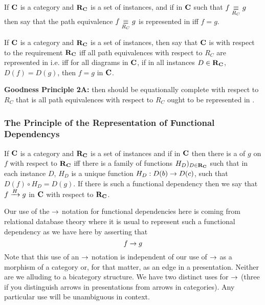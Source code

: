\begin{definition}
If $\catc$ is a  category and $\reqtc$ is a set of instances,
 and if \fgparalleldiag in $\catc$ such that $f \pequiv g$
 then say that the path equivalence $f \pequiv g$ is represented in \catcw iff
 $f=g$.
\end{definition}

\begin{oldtt}
\begin{definition}
If $\catc$ is a  category and $\reqtc$ is a set of instances,
 then say that  $\catc$ is  with respect 
to the requirement $\reqtc$ iff all path equivalences with respect to $R_C$ are represented in \catcw 
i.e. iff for all diagrams \fgparalleldiag in $\catc$,  
if in all instances $D \in \reqtc$, $D(f)=D(g)$,  then $f=g$ in $\catc$.
\end{definition}
\end{oldtt}

\textbf{Goodness Principle 2A:} \IfSforCwithRCwords then \catcw should be equationally complete with respect to $R_C$ that is all path equivalences with respect to $R_C$  ought to be represented in \catc.

\subsubsection{The Principle of the Representation of Functional Dependencys}

\begin{definition}
If $\catc$ is a category and $\reqtc$ is a set of instances and if \fgsourcediag
in $\catc$ then there is a   of $g$ on $f$ with respect to $\reqtc$ iff
there is a family of functions $H_D)_{D \in \reqtc}$ such that 
in each instance $D$, $H_D$ is a unique function $H_D: D(b) \morph D(c)$, such that $D(f) \circ H_D = D(g)$. 
If there is such a functional dependency then we say that $\fundep{H}{f}{g}$ in $\catc$ with respect to $\reqtc$.
\end{definition}

Our use of the $\morph$ notation for functional dependencies here is coming from relational database theory where it is usual to represent such a functional dependency as we have here by asserting that 
$$
f \morph g
$$
Note that this use of an $\morph$ notation is independent of our use of $\morph$ as a morphism of a category 
or, for that matter, as an edge in a presentation. Neither are we alluding to a bicategory structure. We have two distinct uses for $\morph$ (three if you distinguish arrows in presentations from arrows in categories). Any particular use will be unambiguous in context.

